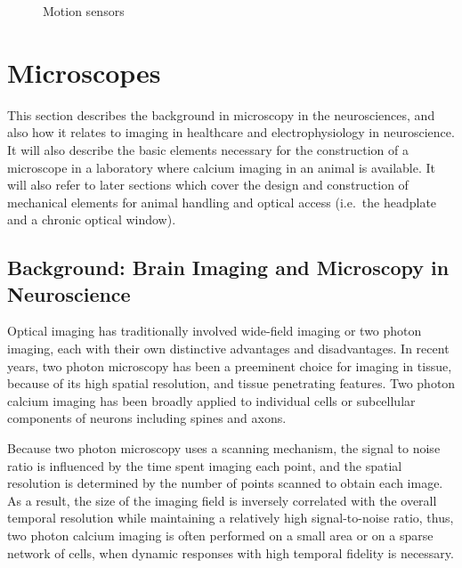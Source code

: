 \documentclass[
  12pt,
]{report}
\numberwithin{figure}{section}
\numberwithin{table}{section}
\numberwithin{equations}{section}
\begin{document}
\begin{figure}
\centering


\caption{Motion sensors}

\label{fig:motion-sensors}

\end{figure}

\hypertarget{microscopes}{%
\section{Microscopes}\label{microscopes}}

This section describes the background in microscopy in the
neurosciences, and also how it relates to imaging in healthcare and
electrophysiology in neuroscience. It will also describe the basic
elements necessary for the construction of a microscope in a laboratory
where calcium imaging in an animal is available. It will also refer to
later sections which cover the design and construction of mechanical
elements for animal handling and optical access (i.e.~the headplate and
a chronic optical window).

\hypertarget{background-brain-imaging-and-microscopy-in-neuroscience}{%
\subsection{Background: Brain Imaging and Microscopy in
Neuroscience}\label{background-brain-imaging-and-microscopy-in-neuroscience}}

Optical imaging has traditionally involved wide-field imaging or two
photon imaging, each with their own distinctive advantages and
disadvantages. In recent years, two photon microscopy has been a
preeminent choice for imaging in tissue, because of its high spatial
resolution, and tissue penetrating features. Two photon calcium imaging
has been broadly applied to individual cells or subcellular components
of neurons including spines and axons.

Because two photon microscopy uses a scanning mechanism, the signal to
noise ratio is influenced by the time spent imaging each point, and the
spatial resolution is determined by the number of points scanned to
obtain each image. As a result, the size of the imaging field is
inversely correlated with the overall temporal resolution while
maintaining a relatively high signal-to-noise ratio, thus, two photon
calcium imaging is often performed on a small area or on a sparse
network of cells, when dynamic responses with high temporal fidelity is
necessary.
\end{document}
